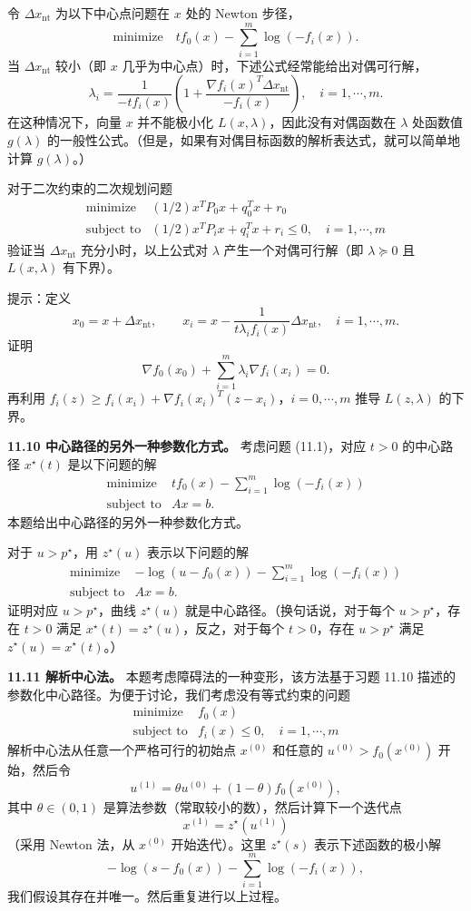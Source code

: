 \documentclass[UTF8, 12pt, fontset=fandol, oneside]{ctexart}
\begin{document}
令 $\Delta x_{\mathrm{nt}}$ 为以下中心点问题在 $x$ 处的 Newton 步径，
\[
\text{minimize}\quad tf_0(x)-\sum_{i=1}^m\log(-f_i(x)).
\]
当 $\Delta x_{\mathrm{nt}}$ 较小（即 $x$ 几乎为中心点）时，下述公式经常能给出对偶可行解，
\[
\lambda_i=\frac{1}{-tf_i(x)}\left(1+\frac{\nabla f_i(x)^T\Delta x_{\mathrm{nt}}}{-f_i(x)}\right),\quad i=1,\cdots,m.
\]
在这种情况下，向量 $x$ 并不能极小化 $L(x,\lambda)$，因此没有对偶函数在 $\lambda$ 处函数值 $g(\lambda)$ 的一般性公式。（但是，如果有对偶目标函数的解析表达式，就可以简单地计算 $g(\lambda)$。）

对于二次约束的二次规划问题
\[
\begin{array}{ll}
\text{minimize} & (1/2)x^TP_0x+q_0^Tx+r_0\\
\text{subject to} & (1/2)x^TP_ix+q_i^Tx+r_i\leq 0,\quad i=1,\cdots,m
\end{array}
\]
验证当 $\Delta x_{\mathrm{nt}}$ 充分小时，以上公式对 $\lambda$ 产生一个对偶可行解（即 $\lambda\succeq 0$ 且 $L(x,\lambda)$ 有下界）。

提示：定义
\[
x_0=x+\Delta x_{\mathrm{nt}},\qquad x_i=x-\frac{1}{t\lambda_i f_i(x)}\Delta x_{\mathrm{nt}},\quad i=1,\cdots,m.
\]
证明
\[
\nabla f_0(x_0)+\sum_{i=1}^m \lambda_i\nabla f_i(x_i)=0.
\]
再利用 $f_i(z)\geq f_i(x_i)+\nabla f_i(x_i)^T(z-x_i)$，$i=0,\cdots,m$ 推导 $L(z,\lambda)$ 的下界。

\noindent\textbf{11.10 中心路径的另外一种参数化方式。} 考虑问题 (11.1)，对应 $t>0$ 的中心路径 $x^\star(t)$ 是以下问题的解
\[
\begin{array}{ll}
\text{minimize} & tf_0(x)-\displaystyle\sum_{i=1}^m\log(-f_i(x))\\
\text{subject to} & Ax=b.
\end{array}
\]
本题给出中心路径的另外一种参数化方式。

对于 $u>p^\star$，用 $z^\star(u)$ 表示以下问题的解
\[
\begin{array}{ll}
\text{minimize} & -\log(u-f_0(x))-\displaystyle\sum_{i=1}^m\log(-f_i(x))\\
\text{subject to} & Ax=b.
\end{array}
\]
证明对应 $u>p^\star$，曲线 $z^\star(u)$ 就是中心路径。（换句话说，对于每个 $u>p^\star$，存在 $t>0$ 满足 $x^\star(t)=z^\star(u)$，反之，对于每个 $t>0$，存在 $u>p^\star$ 满足 $z^\star(u)=x^\star(t)$。）

\noindent\textbf{11.11 解析中心法。} 本题考虑障碍法的一种变形，该方法基于习题 11.10 描述的参数化中心路径。为便于讨论，我们考虑没有等式约束的问题
\[
\begin{array}{ll}
\text{minimize} & f_0(x)\\
\text{subject to} & f_i(x)\leq 0,\quad i=1,\cdots,m
\end{array}
\]
解析中心法从任意一个严格可行的初始点 $x^{(0)}$ 和任意的 $u^{(0)}>f_0(x^{(0)})$ 开始，然后令
\[
u^{(1)}=\theta u^{(0)}+(1-\theta)f_0(x^{(0)}),
\]
其中 $\theta\in(0,1)$ 是算法参数（常取较小的数），然后计算下一个迭代点
\[
x^{(1)}=z^\star(u^{(1)})
\]
（采用 Newton 法，从 $x^{(0)}$ 开始迭代）。这里 $z^\star(s)$ 表示下述函数的极小解
\[
-\log(s-f_0(x))-\sum_{i=1}^m\log(-f_i(x)),
\]
我们假设其存在并唯一。然后重复进行以上过程。
\end{document}
